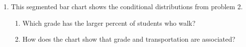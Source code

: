 \documentclass[11pt]{article}
\begin{document}
\begin{enumerate}
\begin{enumerate}[itemsep=1em]
\end{enumerate}
\work{1.5em}

\item This segmented bar chart shows the conditional distributions from problem 2.
\begin{center}\end{center}
\begin{enumerate}[itemsep=1.4em]
  \item Which grade has the larger percent of students who walk? 
  \item How does the chart show that grade and transportation are associated?

\end{enumerate}

\end{enumerate}
\end{document}
